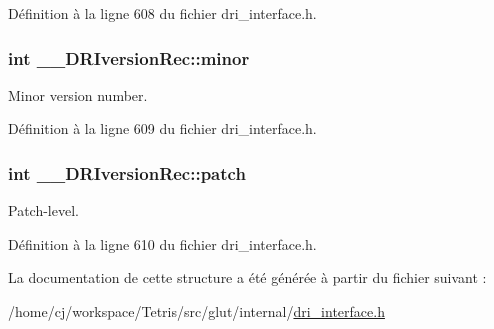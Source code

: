 Définition à la ligne 608 du fichier dri\-\_\-interface.\-h.

\hypertarget{struct_____d_r_iversion_rec_a315635b82bb1a773097074ef6db3481b}{
\subsubsection[{minor}]{\setlength{\rightskip}{0pt plus 5cm}int \-\_\-\-\_\-\-D\-R\-Iversion\-Rec\-::minor}}\label{struct_____d_r_iversion_rec_a315635b82bb1a773097074ef6db3481b}
Minor version number. 

Définition à la ligne 609 du fichier dri\-\_\-interface.\-h.

\hypertarget{struct_____d_r_iversion_rec_af1b4ce3ade39632a6d4e0f1ffbb79323}{
\subsubsection[{patch}]{\setlength{\rightskip}{0pt plus 5cm}int \-\_\-\-\_\-\-D\-R\-Iversion\-Rec\-::patch}}\label{struct_____d_r_iversion_rec_af1b4ce3ade39632a6d4e0f1ffbb79323}
Patch-\/level. 

Définition à la ligne 610 du fichier dri\-\_\-interface.\-h.



La documentation de cette structure a été générée à partir du fichier suivant \-:\begin{DoxyCompactItemize}
\item 
/home/cj/workspace/\-Tetris/src/glut/internal/\hyperlink{dri__interface_8h}{dri\-\_\-interface.\-h}\end{DoxyCompactItemize}
